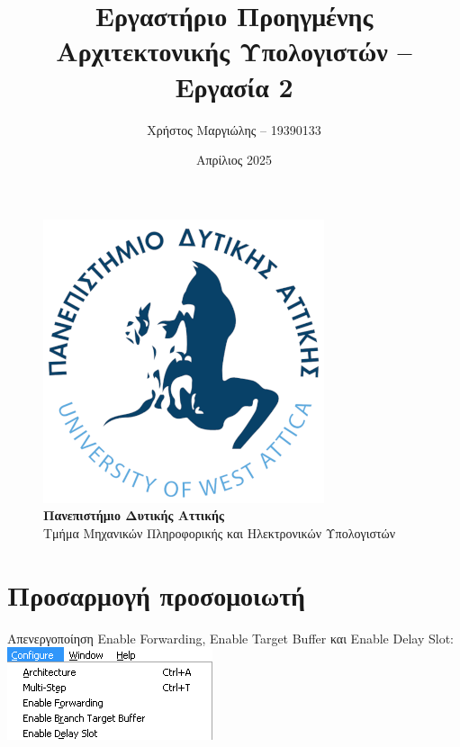 \documentclass[12pt]{article}
\title{Εργαστήριο Προηγμένης Αρχιτεκτονικής Υπολογιστών -- Εργασία 2}
\author{Χρήστος Μαργιώλης -- 19390133}
\date{Απρίλιος 2025}
\begin{document}
\begin{titlepage}
        \maketitle
        \begin{figure}[t!]
        \begin{center}
        \includegraphics[scale=0.3]{./res/uniwalogo.png} \\
        \Large
        \textbf{Πανεπιστήμιο Δυτικής Αττικής} \\
        \large
        Τμήμα Μηχανικών Πληροφορικής και Ηλεκτρονικών Υπολογιστών
        \end{center}
        \end{figure}
\end{titlepage}

\renewcommand{\contentsname}{Περιεχόμενα}
\tableofcontents
\pagebreak

\section{Προσαρμογή προσομοιωτή}

Απενεργοποίηση Enable Forwarding, Enable Target Buffer και Enable Delay Slot:
\\

\includegraphics{res/disable.png} \\
\end{document}
